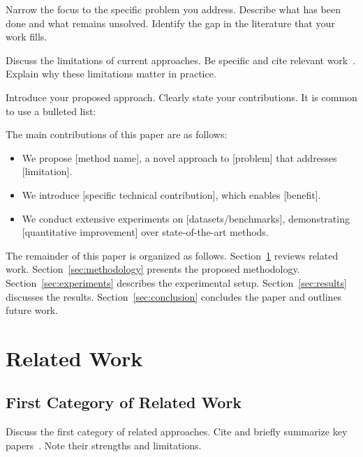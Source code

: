 \documentclass[conference,10pt]{IEEEtran}
\begin{document}
Narrow the focus to the specific problem you address. Describe what has
been done and what remains unsolved. Identify the gap in the literature
that your work fills.

Discuss the limitations of current approaches. Be specific and cite
relevant work~\cite{ref_limitation_1, ref_limitation_2}. Explain why
these limitations matter in practice.

Introduce your proposed approach. Clearly state your contributions.
It is common to use a bulleted list:

The main contributions of this paper are as follows:
\begin{itemize}
    \item We propose [method name], a novel approach to [problem] that
          addresses [limitation].
    \item We introduce [specific technical contribution], which enables
          [benefit].
    \item We conduct extensive experiments on [datasets/benchmarks],
          demonstrating [quantitative improvement] over state-of-the-art
          methods.
\end{itemize}

The remainder of this paper is organized as follows.
Section~\ref{sec:related_work} reviews related work.
Section~\ref{sec:methodology} presents the proposed methodology.
Section~\ref{sec:experiments} describes the experimental setup.
Section~\ref{sec:results} discusses the results.
Section~\ref{sec:conclusion} concludes the paper and outlines future work.

\section{Related Work}
\label{sec:related_work}

\subsection{First Category of Related Work}
\label{subsec:related_category_1}
Discuss the first category of related approaches. Cite and briefly
summarize key papers~\cite{ref_related_1, ref_related_2}. Note their
strengths and limitations.
\end{document}
